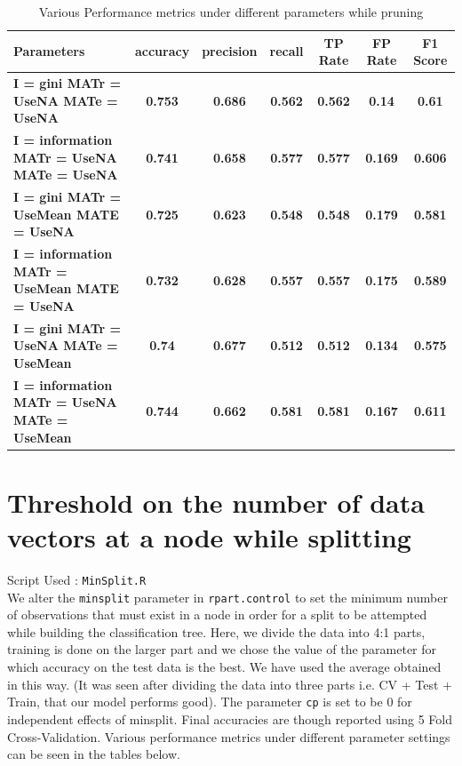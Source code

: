 \documentclass[12pt]{article}%
\begin{document}
\begin{center}
\begin{table}
\centering
\label{table:prune}
\caption{Various Performance metrics under different parameters while pruning}
\begin{tabular}{|p{2in}|c|c|c|c|c|c|}
 \hline
 {\bf Parameters } & {\bf accuracy } & {\bf precision } & {\bf recall } & {\bf TP Rate } & {\bf FP Rate } & {\bf F1 Score } \\ \hline
 {\bf I = gini MATr = UseNA MATe = UseNA } & {\bf 0.753 } & {\bf 0.686 } & {\bf 0.562 } & {\bf 0.562 } & {\bf 0.14 } & {\bf 0.61 } \\ \hline
  {\bf I = information MATr = UseNA MATe = UseNA } & {\bf 0.741 } & {\bf 0.658 } & {\bf 0.577 } & {\bf 0.577 } & {\bf 0.169 } & {\bf 0.606 } \\ \hline
  {\bf I = gini MATr = UseMean MATE = UseNA}& {\bf 0.725 } & {\bf 0.623 } & {\bf 0.548 } & {\bf 0.548 } & {\bf 0.179 } & {\bf 0.581 } \\ \hline
  {\bf I = information MATr = UseMean MATE = UseNA} & {\bf 0.732 } & {\bf 0.628 } & {\bf 0.557 } & {\bf 0.557 } & {\bf 0.175 } & {\bf 0.589 } \\ \hline
  {\bf I = gini MATr = UseNA MATe = UseMean  } & {\bf 0.74 } & {\bf 0.677 } & {\bf 0.512 } & {\bf 0.512 } & {\bf 0.134 } & {\bf 0.575 } \\ \hline
  {\bf I = information MATr = UseNA MATe = UseMean  } & {\bf 0.744 } & {\bf 0.662 } & {\bf 0.581 } & {\bf 0.581 } & {\bf 0.167 } & {\bf 0.611 } \\ \hline
\end{tabular}
\end{table}
\end{center}

\section{Threshold on the number of data vectors at a node while splitting}
Script Used : {\tt MinSplit.R} \\ 
We alter the {\tt minsplit} parameter in {\tt rpart.control} to set the minimum number of observations that must exist in a node in order for a split to be attempted while building the classification tree.
Here, we divide the data into 4:1 parts, training is done on the larger part and we chose the value of the parameter for which accuracy on the test data is the best. We have used the average obtained in this way. (It was seen after dividing the data into three parts i.e. CV +  Test +  Train, that our model performs good). The parameter {\tt cp} is set to be 0 for independent effects of minsplit.  Final accuracies are though reported using 5 Fold Cross-Validation. Various performance metrics under different parameter settings can be seen in the tables below.
\end{document}
